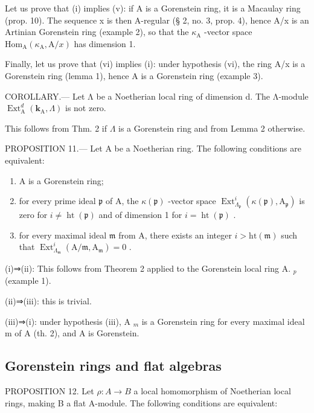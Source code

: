 Let us prove that (i) implies (v): if A is a Gorenstein ring, it is a Macaulay ring (prop. 10). The sequence x is then A-regular (§ 2, no. 3, prop. 4), hence A/x is an Artinian Gorenstein ring (example 2), so that the \(\kappa_{\mathrm{A}}\) -vector space \(\mathrm{Hom}_{\mathrm{A}}(\kappa_{\mathrm{A}}, \mathrm{A}/x)\) has dimension 1.

Finally, let us prove that (vi) implies (i): under hypothesis (vi), the ring A/x is a Gorenstein ring (lemma 1), hence A is a Gorenstein ring (example 3).

COROLLARY.--- Let Λ be a Noetherian local ring of dimension d. The Λ-module \(\operatorname{Ext}_{\mathrm{A}}^{d}(\mathbf{k}_{\mathrm{A}},\Lambda)\) is not zero.

This follows from Thm. 2 if \(\Lambda\) is a Gorenstein ring and from Lemma 2 otherwise.

PROPOSITION 11.--- Let A be a Noetherian ring. The following conditions are equivalent:

\begin{enumerate}
\def\labelenumi{(\roman{enumi})}
\item
  A is a Gorenstein ring;
\item
  for every prime ideal \(\mathfrak{p}\) of A, the \(\kappa(\mathfrak{p})\) -vector space \(\operatorname{Ext}_{\Lambda_{\mathfrak{p}}}^{i}(\kappa(\mathfrak{p}),\mathrm{A}_{\mathfrak{p}})\) is zero for \(i \neq \operatorname{ht}(\mathfrak{p})\) and of dimension 1 for \(i = \operatorname{ht}(\mathfrak{p})\) .
\item
  for every maximal ideal \(\mathfrak{m}\) from A, there exists an integer \(i > \mathrm{ht}(\mathfrak{m})\) such that \(\operatorname{Ext}_{\Lambda_{\mathfrak{m}}}^{i}(\mathrm{A}/\mathfrak{m},\mathrm{A}_{\mathfrak{m}}) = 0\) .
\end{enumerate}

(i)⇒(ii): This follows from Theorem 2 applied to the Gorenstein local ring A. \(_{p}\) (example 1).

(ii)⇒(iii): this is trivial.

(iii)⇒(i): under hypothesis (iii), A \(_{m}\) is a Gorenstein ring for every maximal ideal m of A (th. 2), and A is Gorenstein.

\subsection{Gorenstein rings and flat algebras}

PROPOSITION 12. Let \(\rho: A \to B\) a local homomorphism of Noetherian local rings, making B a flat A-module. The following conditions are equivalent:

